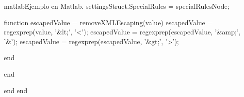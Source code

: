 \begin{sourcecode}{matlab}{Ejemplo en Matlab.}
            settingsStruct.SpecialRules = specialRulesNode;
            
            function escapedValue = removeXMLEscaping(value)
                escapedValue = regexprep(value, '&lt;', '<');
                escapedValue = regexprep(escapedValue, '&amp;', '&');
                escapedValue = regexprep(escapedValue, '&gt;', '>');
                
            end
            
        end
        
      
    end
end


\end{sourcecode}